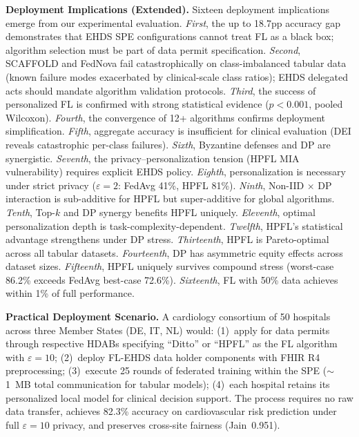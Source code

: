 \documentclass[conference,a4paper]{IEEEtran}
\begin{document}
\smallskip\noindent\textbf{Deployment Implications (Extended).}
Sixteen deployment implications emerge from our experimental evaluation. \textit{First}, the up to 18.7pp accuracy gap demonstrates that EHDS SPE configurations cannot treat FL as a black box; algorithm selection must be part of data permit specification. \textit{Second}, SCAFFOLD and FedNova fail catastrophically on class-imbalanced tabular data (known failure modes exacerbated by clinical-scale class ratios); EHDS delegated acts should mandate algorithm validation protocols. \textit{Third}, the success of personalized FL is confirmed with strong statistical evidence ($p < 0.001$, pooled Wilcoxon). \textit{Fourth}, the convergence of 12+ algorithms confirms deployment simplification. \textit{Fifth}, aggregate accuracy is insufficient for clinical evaluation (DEI reveals catastrophic per-class failures). \textit{Sixth}, Byzantine defenses and DP are synergistic. \textit{Seventh}, the privacy--personalization tension (HPFL MIA vulnerability) requires explicit EHDS policy. \textit{Eighth}, personalization is necessary under strict privacy ($\varepsilon{=}2$: FedAvg 41\%, HPFL 81\%). \textit{Ninth}, Non-IID $\times$ DP interaction is sub-additive for HPFL but super-additive for global algorithms. \textit{Tenth}, Top-$k$ and DP synergy benefits HPFL uniquely. \textit{Eleventh}, optimal personalization depth is task-complexity-dependent. \textit{Twelfth}, HPFL's statistical advantage strengthens under DP stress. \textit{Thirteenth}, HPFL is Pareto-optimal across all tabular datasets. \textit{Fourteenth}, DP has asymmetric equity effects across dataset sizes. \textit{Fifteenth}, HPFL uniquely survives compound stress (worst-case 86.2\% exceeds FedAvg best-case 72.6\%). \textit{Sixteenth}, FL with 50\% data achieves within 1\% of full performance.

\smallskip\noindent\textbf{Practical Deployment Scenario.}
A cardiology consortium of 50 hospitals across three Member States (DE, IT, NL) would: (1)~apply for data permits through respective HDABs specifying ``Ditto'' or ``HPFL'' as the FL algorithm with $\varepsilon{=}10$; (2)~deploy FL-EHDS data holder components with FHIR R4 preprocessing; (3)~execute 25 rounds of federated training within the SPE ($\sim$1~MB total communication for tabular models); (4)~each hospital retains its personalized local model for clinical decision support. The process requires no raw data transfer, achieves 82.3\% accuracy on cardiovascular risk prediction under full $\varepsilon{=}10$ privacy, and preserves cross-site fairness (Jain~0.951).
\end{document}
